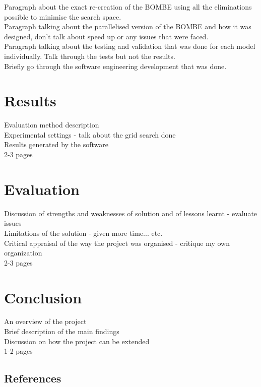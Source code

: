 \documentclass[12pt,a4paper]{article}
\begin{document}
Paragraph about the exact re-creation of the BOMBE using all the eliminations possible to minimise the search space.\\

Paragraph talking about the parallelised version of the BOMBE and how it was designed, don't talk about speed up or any issues that were faced.\\

Paragraph talking about the testing and validation that was done for each model individually. Talk through the tests but not the results.\\

Briefly go through the software engineering development that was done.

\section{Results}

Evaluation method description\\
Experimental settings - talk about the grid search done\\
Results generated by the software\\
2-3 pages

\section{Evaluation}

Discussion of strengths and weaknesses of solution and of lessons learnt - evaluate issues\\
Limitations of the solution - given more time... etc.\\
Critical appraisal of the way the project was organised - critique my own organization\\
2-3 pages

\section{Conclusion}

An overview of the project\\
Brief description of the main findings\\
Discussion on how the project can be extended\\
1-2 pages

\subsection{References} 



\nocite{*}
\end{document}
